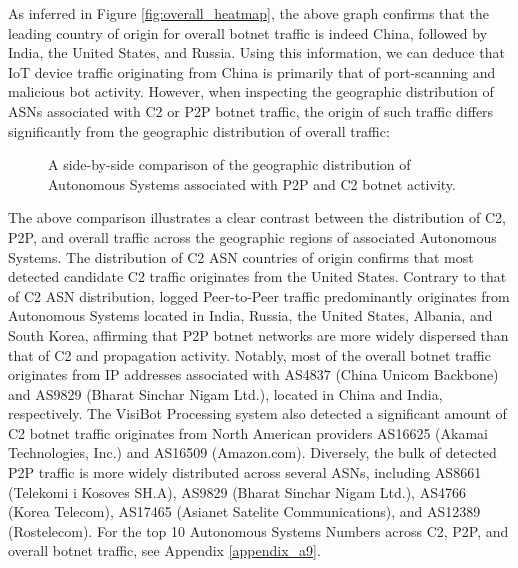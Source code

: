 As inferred in Figure \ref{fig:overall_heatmap}, the above graph confirms that the leading country of origin for overall botnet traffic is indeed China, followed by India, the United States, and Russia. Using this information, we can deduce that IoT device traffic originating from China is primarily that of port-scanning and malicious bot activity. However, when inspecting the geographic distribution of ASNs associated with C2 or P2P botnet traffic, the origin of such traffic differs significantly from the geographic distribution of overall traffic:

\begin{figure}[!htb]
    \centering
    \qquad
    \caption{A side-by-side comparison of the geographic distribution of Autonomous Systems associated with P2P and C2 botnet activity.}
    \label{fig:p2p_c2_asn_dist}
\end{figure}

The above comparison illustrates a clear contrast between the distribution of C2, P2P, and overall traffic across the geographic regions of associated Autonomous Systems. The distribution of C2 ASN countries of origin confirms that most detected candidate C2 traffic originates from the United States. Contrary to that of C2 ASN distribution, logged Peer-to-Peer traffic predominantly originates from Autonomous Systems located in India, Russia, the United States, Albania, and South Korea, affirming that P2P botnet networks are more widely dispersed than that of C2 and propagation activity. Notably, most of the overall botnet traffic originates from IP addresses associated with AS4837 (China Unicom Backbone) and AS9829 (Bharat Sinchar Nigam Ltd.), located in China and India, respectively. The VisiBot Processing system also detected a significant amount of C2 botnet traffic originates from North American providers AS16625 (Akamai Technologies, Inc.) and AS16509 (Amazon.com). Diversely, the bulk of detected P2P traffic is more widely distributed across several ASNs, including AS8661 (Telekomi i Kosoves SH.A), AS9829 (Bharat Sinchar Nigam Ltd.), AS4766 (Korea Telecom), AS17465 (Asianet Satelite Communications), and AS12389 (Rostelecom). For the top 10 Autonomous Systems Numbers across C2, P2P, and overall botnet traffic, see Appendix \ref{appendix_a9}. 


